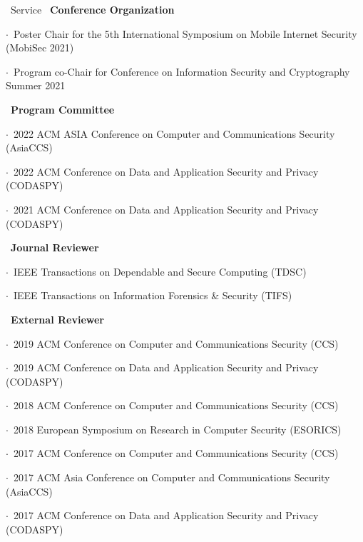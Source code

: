 \documentclass{resume} %
\begin{document}
\begin{rSection}{\faGenderless~Service}
    \textbullet~{\bf Conference Organization} \\
        \strut\hspace{1cm}$\cdot$~Poster Chair for the 5th International Symposium on Mobile Internet Security (MobiSec 2021)\\
        \strut\hspace{1cm}$\cdot$~Program co-Chair for Conference on Information Security and Cryptography Summer 2021

    \textbullet~{\bf Program Committee} \\
    	\strut\hspace{1cm}$\cdot$~2022 ACM ASIA Conference on Computer and Communications Security (AsiaCCS)\\
    	\strut\hspace{1cm}$\cdot$~2022 ACM Conference on Data and Application Security and Privacy (CODASPY)\\
        \strut\hspace{1cm}$\cdot$~2021 ACM Conference on Data and Application Security and Privacy (CODASPY)

    \textbullet~{\bf Journal Reviewer} \\
        \strut\hspace{1cm}$\cdot$~IEEE Transactions on Dependable and Secure Computing (TDSC)\\
        \strut\hspace{1cm}$\cdot$~IEEE Transactions on Information Forensics \& Security (TIFS)

	\textbullet~{\bf External Reviewer} \\
        \strut\hspace{1cm}$\cdot$~2019 ACM Conference on Computer and Communications Security (CCS)\\
        \strut\hspace{1cm}$\cdot$~2019 ACM Conference on Data and Application Security and Privacy (CODASPY)\\
		\strut\hspace{1cm}$\cdot$~2018 ACM Conference on Computer and Communications Security (CCS)\\
		\strut\hspace{1cm}$\cdot$~2018 European Symposium on Research in Computer Security (ESORICS)\\
		\strut\hspace{1cm}$\cdot$~2017 ACM Conference on Computer and Communications Security (CCS)\\
		\strut\hspace{1cm}$\cdot$~2017 ACM Asia Conference on Computer and Communications Security (AsiaCCS) \\
		\strut\hspace{1cm}$\cdot$~2017 ACM Conference on Data and Application Security and Privacy (CODASPY)


\end{rSection}
\end{document}
